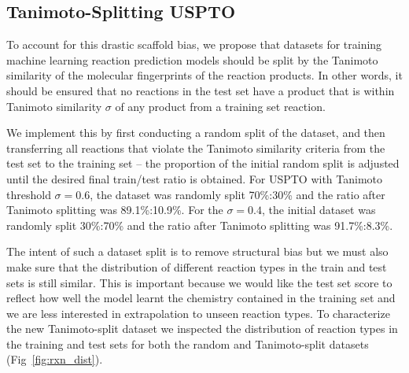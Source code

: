 \subsection{Tanimoto-Splitting USPTO}

To account for this drastic scaffold bias, we propose that datasets for training machine learning reaction prediction models should be split by the Tanimoto similarity of the molecular fingerprints of the reaction products. In other words, it should be ensured that no reactions in the test set have a product that is within Tanimoto similarity $\sigma$ of any product from a training set reaction.

We implement this by first conducting a random split of the dataset, and then transferring all reactions that violate the Tanimoto similarity criteria from the test set to the training set -- the proportion of the initial random split is adjusted until the desired final train/test ratio is obtained. For USPTO with Tanimoto threshold $\sigma=0.6$, the dataset was randomly split 70\%:30\% and the ratio after Tanimoto splitting was 89.1\%:10.9\%. For the $\sigma=0.4$, the initial dataset was randomly split 30\%:70\% and the ratio after Tanimoto splitting was 91.7\%:8.3\%. 

The intent of such a dataset split is to remove structural bias but we must also make sure that the distribution of different reaction types in the train and test sets is still similar. This is important because we would like the test set score to reflect how well the model learnt the chemistry contained in the training set and we are less interested in extrapolation to unseen reaction types. To characterize the new Tanimoto-split dataset we inspected the distribution of reaction types in the training and test sets for both the random and Tanimoto-split datasets (Fig~\ref{fig:rxn_dist}). 

